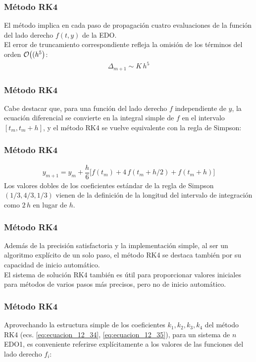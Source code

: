 \begin{frame}
\frametitle{Método RK4}
El método implica en cada paso de propagación cuatro evaluaciones de la función del lado derecho $f(t, y)$ de la EDO.
\\
\bigskip
El error de truncamiento correspondiente refleja la omisión de los términos del orden $\order{(h^{5}}$:
\begin{align}
\Delta_{m+1} \sim K \, h^{5}
\end{align}
\end{frame}
\begin{frame}
\frametitle{Método RK4}
Cabe destacar que, para una función del lado derecho $f$ independiente de $y$, la ecuación diferencial se convierte en la integral simple de $f$ en el intervalo $[t_{m}, t_{m} + h]$, y el método RK4 se vuelve equivalente con la regla de Simpson:
\end{frame}
\begin{frame}
\frametitle{Método RK4}
\begin{align*}
y_{m+1} = y_{m} + \dfrac{h}{6} \big[ f(t_{m}) + 4 \, f(t_{m} + h/2) + f(t_{m} + h) \big]
\end{align*}
Los valores dobles de los coeficientes estándar de la regla de Simpson $(1/3, 4/3, 1/3)$ vienen de la definición de la longitud del intervalo de integración como $2 \, h$ en lugar de $h$.
\end{frame}
\begin{frame}
\frametitle{Método RK4}
Además de la precisión satisfactoria y la implementación simple, al ser un algoritmo explícito de un solo paso, el método RK4 se destaca también por su capacidad de inicio automático.
\\
\bigskip
El sistema de solución RK4 también es útil para proporcionar valores iniciales para métodos de varios pasos más precisos, pero no de inicio automático.
\end{frame}
\begin{frame}
\frametitle{Método RK4}
Aprovechando la estructura simple de los coeficientes $k_{1}, k_{2}, k_{3}, k_{4}$ del método RK4 (ecs. \ref{eq:ecuacion_12_34}, \ref{eq:ecuacion_12_35}), para un sistema de $n$ EDO1, es conveniente referirse explícitamente a los valores de las funciones del lado derecho $f_{i}$:
\end{frame}
